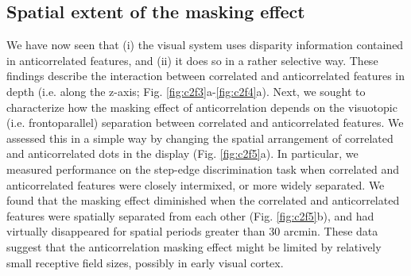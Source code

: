 \subsection{Spatial extent of the masking effect}
We have now seen that (i) the visual system uses disparity information contained in anticorrelated features, and (ii) it does so in a rather selective way. These findings describe the interaction between correlated and anticorrelated features in depth (i.e. along the z-axis; Fig. \ref{fig:c2f3}a-\ref{fig:c2f4}a). Next, we sought to characterize how the masking effect of anticorrelation depends on the visuotopic (i.e. frontoparallel) separation between correlated and anticorrelated features. We assessed this in a simple way by changing the spatial arrangement of correlated and anticorrelated dots in the display (Fig. \ref{fig:c2f5}a). In particular, we measured performance on the step-edge discrimination task when correlated and anticorrelated features were closely intermixed, or more widely separated. We found that the masking effect diminished when the correlated and anticorrelated features were spatially separated from each other (Fig. \ref{fig:c2f5}b), and had virtually disappeared for spatial periods greater than 30 arcmin. These data suggest that the anticorrelation masking effect might be limited by relatively small receptive field sizes, possibly in early visual cortex.



